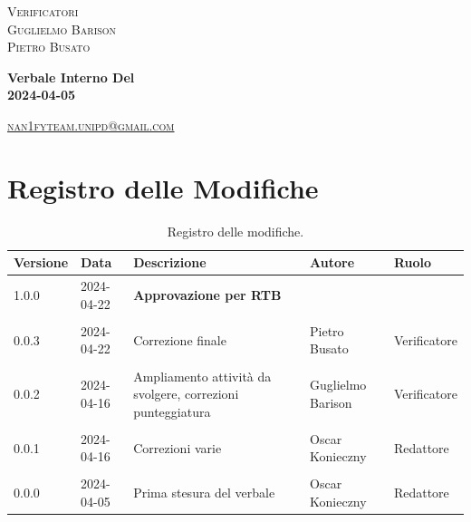 \documentclass[8pt]{article}
\begin{document}
\begin{titlepage}
\begin{minipage}[t]{0.47\textwidth}
		{\large{\textsc{Verificatori}}
			\vspace{3mm}
			{\\\large{\textsc{Guglielmo Barison}\\}} %
			{\large{\textsc{Pietro Busato}}}
			
		}
		\vspace{4mm}\vspace{4mm}
	\end{minipage}
	\vspace{4cm}
	\begin{center}
		\begin{flushright}
			{\fontsize{30pt}{52pt}\selectfont \textbf{Verbale Interno Del\\2024-04-05\\}} %
		\end{flushright}
		\vspace{3cm}
	\end{center}
	\vspace{8 cm}
	{\small \textsc{\href{mailto: nan1fyteam.unipd@gmail.com}{nan1fyteam.unipd@gmail.com}}}
\end{titlepage}
\pagestyle{mystyle}
\section*{Registro delle Modifiche}
\begin{table}[ht!]	
	\centering
	\begin{tabular}{p{1.2cm} p{2cm} p{6cm} p{3cm} p{2cm}}
		\toprule
		\textbf{Versione} & \textbf{Data} & \textbf{Descrizione} & \textbf{Autore} & \textbf{Ruolo} \\
		\midrule
  		1.0.0 & 2024-04-22 & \textbf{Approvazione per RTB} \\\\
    		0.0.3 & 2024-04-22 & Correzione finale & Pietro Busato & Verificatore \\\\
		0.0.2 & 2024-04-16 & Ampliamento attività da svolgere, correzioni punteggiatura & Guglielmo Barison & Verificatore \\\\ 
		0.0.1 & 2024-04-16 & Correzioni varie & Oscar Konieczny & Redattore \\\\ %
		0.0.0 & 2024-04-05 & Prima stesura del verbale & Oscar Konieczny & Redattore \\
		\bottomrule
	\end{tabular}
	\caption{Registro delle modifiche.}
	\label{table:Registro delle modifiche}
\end{table}
\newpage
\tableofcontents
\clearpage
\newpage
\justifying
\end{document}
